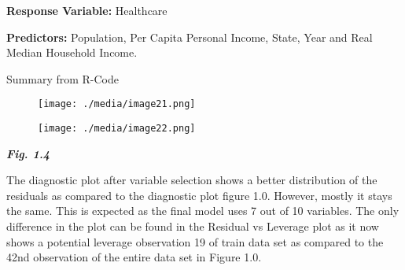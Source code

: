 \documentclass[12pt]{article}
\begin{document}
\vspace{\baselineskip}
\begin{justify}
\textbf{Response Variable: }Healthcare
\end{justify}\par

\textbf{Predictors: }Population, Per Capita Personal Income, State, Year and Real Median Household Income.\par

\begin{justify}
Summary from R-Code
\end{justify}\par




\begin{figure}[H]
	\begin{Center}
		\texttt{[image: ./media/image21.png]}
	\end{Center}
\end{figure}



\par




\begin{figure}[H]
	\begin{Center}
		\texttt{[image: ./media/image22.png]}
	\end{Center}
\end{figure}



\par


\vspace{\baselineskip}
\begin{justify}
\textbf{\textit{Fig. 1.4}}
\end{justify}\par

\begin{justify}
The diagnostic plot after variable selection shows a better distribution of the residuals as compared to the diagnostic plot figure 1.0. However, mostly it stays the same. This is expected as the final model uses 7 out of 10 variables. The only difference in the plot can be found in the Residual vs Leverage plot as it now shows a potential leverage observation 19 of train data set as compared to the 42nd observation of the entire data set in Figure 1.0.
\end{justify}\par
\end{document}
